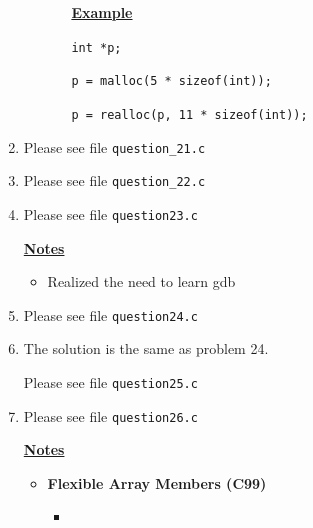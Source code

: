 \documentclass[12pt]{article}
\begin{document}
\begin{enumerate}[1.]
\begin{itemize}
\begin{itemize}
            \bigskip

            \underline{\textbf{Example}}

            \bigskip

            \texttt{int *p;}

            \texttt{p = malloc(5 * sizeof(int));}

            \texttt{p = realloc(p, 11 * sizeof(int));}
        \end{itemize}
    \end{itemize}

    \item

    Please see file \texttt{question\_21.c}

    \item

    Please see file \texttt{question\_22.c}

    \item

    Please see file \texttt{question23.c}

    \bigskip

    \underline{\textbf{Notes}}

    \begin{itemize}
        \item Realized the need to learn gdb
    \end{itemize}

    \item

    Please see file \texttt{question24.c}

    \item

    The solution is the same as problem 24.

    \bigskip

    Please see file \texttt{question25.c}

    \item

    Please see file \texttt{question26.c}

    \bigskip

    \underline{\textbf{Notes}}

    \begin{itemize}
        \item \textbf{Flexible Array Members (C99)}

        \begin{itemize}
            \item
        \end{itemize}
    \end{itemize}

\end{enumerate}
\end{document}
